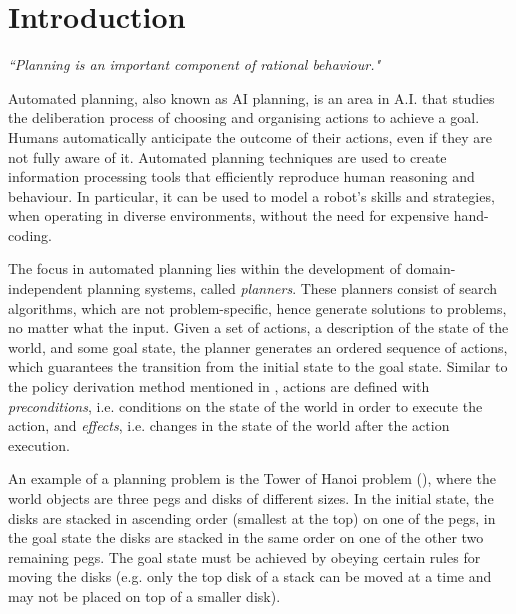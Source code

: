 \section{Introduction}
\begin{center}
\textit{``Planning is an important component of rational behaviour." }\\ \cite{ghallab2004automated}
\end{center}


Automated planning, also known as AI planning, is an area in A.I. that studies the deliberation process of choosing and organising actions to achieve a goal. 
Humans automatically anticipate the outcome of their actions, even if they are not fully aware of it. 
Automated planning techniques are used to create information processing tools that efficiently reproduce human reasoning and behaviour. 
In particular, it can be used to model a robot's skills and strategies, when operating in diverse environments, without the need for expensive hand-coding.

The focus in automated planning lies within the development of {domain-independent} planning systems, called \textit{planners}.
These planners consist of search algorithms, which are not problem-specific, hence generate solutions to problems, no matter what the input. 
Given a set of actions, a description of the state of the world, and some goal state, the planner generates an ordered sequence of actions, which guarantees the transition from the initial state to the goal state. 
Similar to the policy derivation method mentioned in , actions are defined with \textit{preconditions}, i.e. conditions on the state of the world in order to execute the action, and \textit{effects}, i.e. changes in the state of the world after the action execution. 

An example of a planning problem is the Tower of Hanoi problem (\cite{douglas1985metamagical}), where the world objects are three pegs and disks of different sizes. 
In the initial state, the disks are stacked in ascending order (smallest at the top) on one of the pegs, in the goal state the disks are stacked in the same order on one of the other two remaining pegs. 
The goal state must be achieved by obeying certain rules for moving the disks (e.g. only the top disk of a stack can be moved at a time and may not be placed on top of a smaller disk). 

